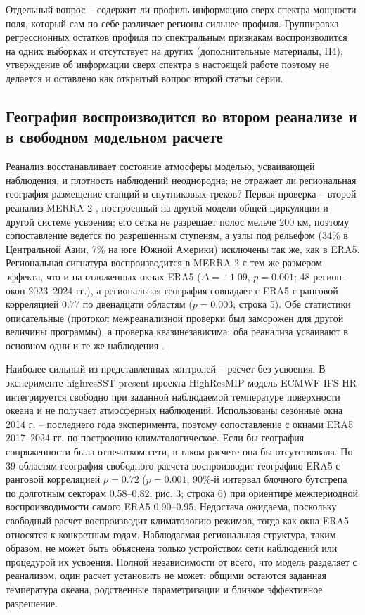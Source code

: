 \documentclass[12pt,a4paper]{article}
\begin{document}
Отдельный вопрос -- содержит ли профиль информацию сверх спектра мощности поля, который сам по себе различает регионы сильнее профиля. Группировка регрессионных остатков профиля по спектральным признакам воспроизводится на одних выборках и отсутствует на других (дополнительные материалы, П4); утверждение об информации сверх спектра в настоящей работе поэтому не делается и оставлено как открытый вопрос второй статьи серии.

\subsection{География воспроизводится во втором реанализе и в свободном модельном расчете}

Реанализ восстанавливает состояние атмосферы моделью, усваивающей наблюдения, и плотность наблюдений неоднородна; не отражает ли региональная география размещение станций и спутниковых треков? Первая проверка -- второй реанализ MERRA-2 \cite{Gelaro2017}, построенный на другой модели общей циркуляции и другой системе усвоения; его сетка не разрешает полос мельче 200 км, поэтому сопоставление ведется по разрешенным ступеням, а узлы под рельефом (34\% в Центральной Азии, 7\% на юге Южной Америки) исключены так же, как в ERA5. Региональная сигнатура воспроизводится в MERRA-2 с тем же размером эффекта, что и на отложенных окнах ERA5 ($\Delta = +1.09$, $p = 0.001$; 48 регион-окон 2023--2024 гг.), а региональная география совпадает с ERA5 с ранговой корреляцией 0.77 по двенадцати областям ($p = 0.003$; строка 5). Обе статистики описательные (протокол межреанализной проверки был заморожен для другой величины программы), а проверка квазинезависима: оба реанализа усваивают в основном одни и те же наблюдения \cite{Hersbach2020,Gelaro2017}.

Наиболее сильный из представленных контролей -- расчет без усвоения. В эксперименте highresSST-present проекта HighResMIP \cite{Haarsma2016} модель ECMWF-IFS-HR \cite{Roberts2018} интегрируется свободно при заданной наблюдаемой температуре поверхности океана и не получает атмосферных наблюдений. Использованы сезонные окна 2014 г. -- последнего года эксперимента, поэтому сопоставление с окнами ERA5 2017--2024 гг. по построению климатологическое. Если бы география сопряженности была отпечатком сети, в таком расчете она бы отсутствовала. По 39 областям география свободного расчета воспроизводит географию ERA5 с ранговой корреляцией $\rho = 0.72$ ($p = 0.001$; 90\%-й интервал блочного бутстрепа по долготным секторам 0.58--0.82; рис. 3; строка 6) при ориентире межпериодной воспроизводимости самого ERA5 0.90--0.95. Недостача ожидаема, поскольку свободный расчет воспроизводит климатологию режимов, тогда как окна ERA5 относятся к конкретным годам. Наблюдаемая региональная структура, таким образом, не может быть объяснена только устройством сети наблюдений или процедурой их усвоения. Полной независимости от всего, что модель разделяет с реанализом, один расчет установить не может: общими остаются заданная температура океана, родственные параметризации и близкое эффективное разрешение.
\end{document}
